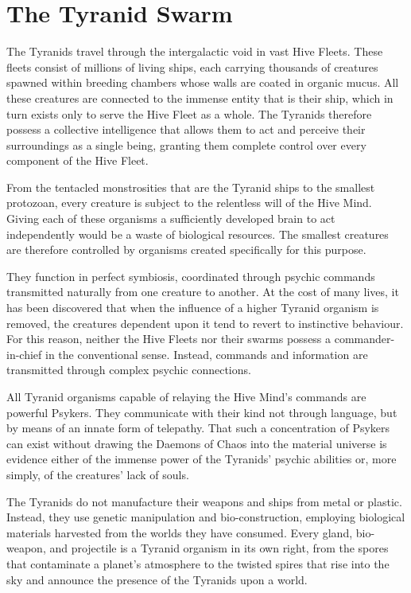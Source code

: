 \section{The Tyranid Swarm}

The Tyranids travel through the intergalactic void in vast Hive Fleets. These fleets consist of millions of living ships, each carrying thousands of creatures spawned within breeding chambers whose walls are coated in organic mucus. All these creatures are connected to the immense entity that is their ship, which in turn exists only to serve the Hive Fleet as a whole. The Tyranids therefore possess a collective intelligence that allows them to act and perceive their surroundings as a single being, granting them complete control over every component of the Hive Fleet.

From the tentacled monstrosities that are the Tyranid ships to the smallest protozoan, every creature is subject to the relentless will of the Hive Mind. Giving each of these organisms a sufficiently developed brain to act independently would be a waste of biological resources. The smallest creatures are therefore controlled by organisms created specifically for this purpose.

They function in perfect symbiosis, coordinated through psychic commands transmitted naturally from one creature to another. At the cost of many lives, it has been discovered that when the influence of a higher Tyranid organism is removed, the creatures dependent upon it tend to revert to instinctive behaviour. For this reason, neither the Hive Fleets nor their swarms possess a commander-in-chief in the conventional sense. Instead, commands and information are transmitted through complex psychic connections.

All Tyranid organisms capable of relaying the Hive Mind's commands are powerful Psykers. They communicate with their kind not through language, but by means of an innate form of telepathy. That such a concentration of Psykers can exist without drawing the Daemons of Chaos into the material universe is evidence either of the immense power of the Tyranids' psychic abilities or, more simply, of the creatures' lack of souls.

The Tyranids do not manufacture their weapons and ships from metal or plastic. Instead, they use genetic manipulation and bio-construction, employing biological materials harvested from the worlds they have consumed. Every gland, bio-weapon, and projectile is a Tyranid organism in its own right, from the spores that contaminate a planet's atmosphere to the twisted spires that rise into the sky and announce the presence of the Tyranids upon a world.

